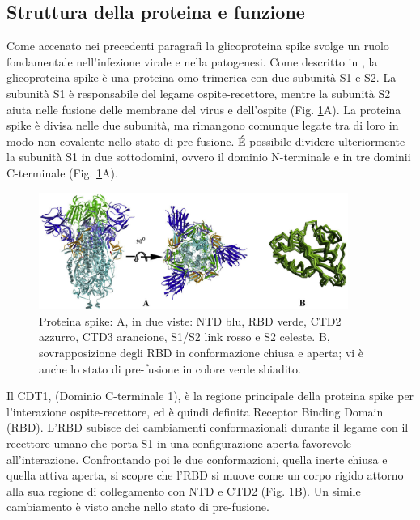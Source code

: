 \subsection{Struttura della proteina e funzione}\label{subsec:strutturaspike}
Come accenato nei precedenti paragrafi la glicoproteina spike svolge un ruolo fondamentale nell'infezione virale e nella patogenesi. Come descritto in \cite{LAHA2020104445}, la glicoproteina spike è una proteina omo-trimerica con due subunità S1 e S2. La subunità S1 è responsabile del legame ospite-recettore, mentre la subunità S2 aiuta nelle fusione delle membrane del virus e dell'ospite (Fig. \ref{fig:subunità}A). La proteina spike è divisa nelle due subunità, ma rimangono comunque legate tra di loro in modo non covalente nello stato di pre-fusione. É possibile dividere ulteriormente la subunità S1 in due sottodomini, ovvero il dominio N-terminale e in tre dominii C-terminale (Fig. \ref{fig:subunità}A).  

\begin{figure}
	\centering
	\includegraphics[width=0.9\textwidth]{Immagini/Subunita.png}
	\caption{Proteina spike: A, in due viste: NTD blu, RBD verde, CTD2 azzurro, CTD3 arancione, S1/S2 link rosso e S2 celeste. B, sovrapposizione degli RBD in conformazione chiusa e aperta; vi è anche lo stato di pre-fusione in colore verde sbiadito.}
	\label{fig:subunità}
\end{figure} 

Il CDT1, (Dominio C-terminale 1), è la regione principale della proteina spike per l'interazione ospite-recettore, ed è quindi definita Receptor Binding Domain (RBD). L'RBD subisce dei cambiamenti conformazionali durante il legame con il recettore umano che porta S1 in una configurazione aperta favorevole all'interazione. Confrontando poi le due conformazioni, quella inerte chiusa e quella attiva aperta, si scopre che l'RBD si muove come un corpo rigido attorno alla sua regione di collegamento con NTD e CTD2 (Fig. \ref{fig:subunità}B). Un simile cambiamento è visto anche nello stato di pre-fusione. 

